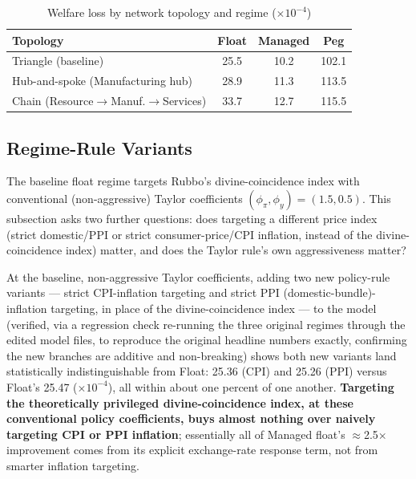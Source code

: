 \documentclass[12pt]{article}
\begin{document}
\begin{table}[H]
\centering
\caption{Welfare loss by network topology and regime ($\times10^{-4}$)}
\label{tab:topology}
\begin{tabular}{lccc}
\toprule
Topology & Float & Managed & Peg \\
\midrule
Triangle (baseline) & 25.5 & 10.2 & 102.1 \\
Hub-and-spoke (Manufacturing hub) & 28.9 & 11.3 & 113.5 \\
Chain (Resource$\to$Manuf.$\to$Services) & 33.7 & 12.7 & 115.5 \\
\bottomrule
\end{tabular}
\end{table}

\subsection{Regime-Rule Variants}
\label{rob:regime_variants}

The baseline float regime targets Rubbo's divine-coincidence index with conventional (non-aggressive)
Taylor coefficients $(\phi_\pi,\phi_y)=(1.5,0.5)$. This subsection asks two further questions: does
targeting a different price index (strict domestic/PPI or strict consumer-price/CPI inflation,
instead of the divine-coincidence index) matter, and does the Taylor rule's own aggressiveness matter?

At the baseline, non-aggressive Taylor coefficients, adding two new policy-rule variants --- strict
CPI-inflation targeting and strict PPI (domestic-bundle)-inflation targeting, in place of the
divine-coincidence index --- to the model (verified, via a regression check re-running the three
original regimes through the edited model files, to reproduce the original headline numbers exactly,
confirming the new branches are additive and non-breaking) shows both new variants land statistically
indistinguishable from Float: 25.36 (CPI) and 25.26 (PPI) versus Float's 25.47 ($\times10^{-4}$), all
within about one percent of one another. \textbf{Targeting the theoretically privileged
divine-coincidence index, at these conventional policy coefficients, buys almost nothing over naively
targeting CPI or PPI inflation}; essentially all of Managed float's $\approx$2.5$\times$ improvement
comes from its explicit exchange-rate response term, not from smarter inflation targeting.
\end{document}
